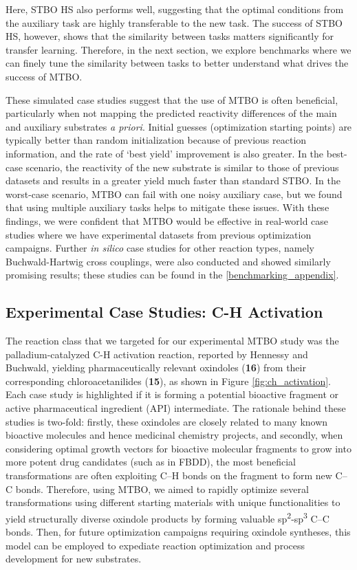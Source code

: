 Here, STBO HS also performs well, suggesting that the optimal conditions from the auxiliary task are highly transferable to the new task. The success of STBO HS, however, shows that the similarity between tasks matters significantly for transfer learning. Therefore, in the next section, we explore benchmarks where we can finely tune the similarity between tasks to better understand what drives the success of MTBO.

These simulated case studies suggest that the use of MTBO is often beneficial, particularly when not mapping the predicted reactivity differences of the main and auxiliary substrates \textit{a priori}. Initial guesses (optimization starting points) are typically better than random initialization because of previous reaction information, and the rate of `best yield' improvement is also greater. In the best-case scenario, the reactivity of the new substrate is similar to those of previous datasets and results in a greater yield much faster than standard STBO. In the worst-case scenario, MTBO can fail with one noisy auxiliary case, but we found that using multiple auxiliary tasks helps to mitigate these issues.  With these findings, we were confident that MTBO would be effective in real-world case studies where we have experimental datasets from previous optimization campaigns. Further \textit{in silico} case studies for other reaction types, namely Buchwald-Hartwig cross couplings, were also conducted and showed similarly promising results; these studies can be found in the \ref{benchmarking_appendix}.

\subsection{Experimental Case Studies: C-H Activation}

The reaction class that we targeted for our experimental MTBO study was the palladium-catalyzed C-H activation reaction, reported by Hennessy and Buchwald, yielding pharmaceutically relevant oxindoles (\textbf{16}) from their corresponding chloroacetanilides (\textbf{15}), as shown in Figure \ref{fig:ch_activation}. Each case study is highlighted if it is forming a potential bioactive fragment or active pharmaceutical ingredient (API) intermediate. The rationale behind these studies is two-fold: firstly, these oxindoles are closely related to many known bioactive molecules and hence medicinal chemistry projects, and secondly, when considering optimal growth vectors for bioactive molecular fragments to grow into more potent drug candidates (such as in FBDD), the most beneficial transformations are often exploiting C--H bonds on the fragment to form new C--C bonds. Therefore, using MTBO, we aimed to rapidly optimize several transformations using different starting materials with unique functionalities to yield structurally diverse oxindole products by forming valuable sp\textsuperscript{2}-sp\textsuperscript{3} C--C bonds. Then, for future optimization campaigns requiring oxindole syntheses, this model can be employed to expediate reaction optimization and process development for new substrates.

